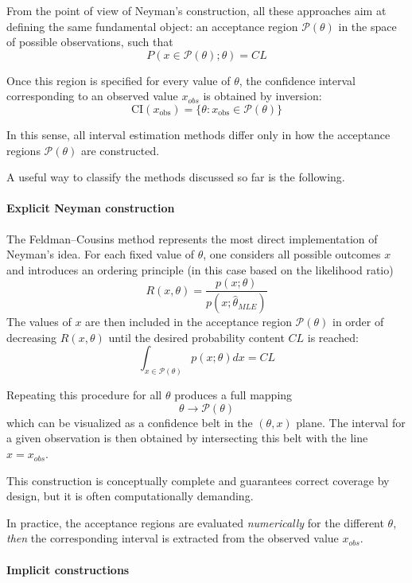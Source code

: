 From the point of view of Neyman’s construction, all these approaches aim at defining the same fundamental object: an acceptance region $\mathcal{P}(\theta)$ in the space of possible observations, such that
\[
P(x \in \mathcal{P}(\theta); \theta) = CL
\]

Once this region is specified for every value of $\theta$, the confidence interval corresponding to an observed value $x_ {obs}$ is obtained by inversion:
\[
\text{CI}(x_{\text{obs}}) = \{ \theta: x_{\text{obs}} \in \mathcal{P}(\theta) \}
\]

In this sense, all interval estimation methods differ only in how the acceptance regions $\mathcal{P}(\theta)$ are constructed.

A useful way to classify the methods discussed so far is the following.

\paragraph{Explicit Neyman construction}

The Feldman--Cousins method represents the most direct implementation of Neyman’s idea. For each fixed value of $\theta$, one considers all possible outcomes $x$ and introduces an ordering principle (in this case based on the likelihood ratio)
\[
R(x,\theta) = \frac{p(x;\theta)}{p(x;\hat{\theta}_{MLE})}
\]
The values of $x$ are then included in the acceptance region $\mathcal{P}(\theta)$ in order of decreasing $R(x,\theta)$ until the desired probability content $CL$ is reached:
\[
\int_{x \in \mathcal{P}(\theta)} p(x;\theta)dx = CL
\]

Repeating this procedure for all $\theta$ produces a full mapping
\[
\theta \longrightarrow \mathcal{P}(\theta)
\]
which can be visualized as a confidence belt in the $(\theta, x)$ plane. The interval for a given observation is then obtained by intersecting this belt with the line $x = x_{obs}$.

This construction is conceptually complete and guarantees correct coverage by design, but it is often computationally demanding.

In practice, the acceptance regions are evaluated \emph{numerically} for the different $\theta$, \emph{then} the corresponding interval is extracted from the observed value $x_{obs}$. 

\paragraph{Implicit constructions}

